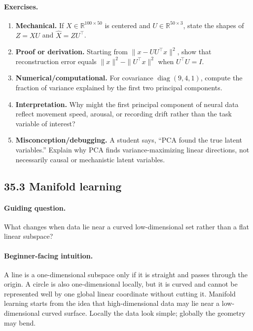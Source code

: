 \paragraph{Exercises.}
\begin{enumerate}[label=\textbf{35.2.\arabic*.}, leftmargin=*]
\item \textbf{Mechanical.} If \(X\in\mathbb R^{100\times 50}\) is centered and \(U\in\mathbb R^{50\times 3}\), state the shapes of \(Z=XU\) and \(\widehat X=Z U^\top\).
\item \textbf{Proof or derivation.} Starting from \(\|x-UU^\top x\|^2\), show that reconstruction error equals \(\|x\|^2-\|U^\top x\|^2\) when \(U^\top U=I\).
\item \textbf{Numerical/computational.} For covariance \(\operatorname{diag}(9,4,1)\), compute the fraction of variance explained by the first two principal components.
\item \textbf{Interpretation.} Why might the first principal component of neural data reflect movement speed, arousal, or recording drift rather than the task variable of interest?
\item \textbf{Misconception/debugging.} A student says, ``PCA found the true latent variables.'' Explain why PCA finds variance-maximizing linear directions, not necessarily causal or mechanistic latent variables.
\end{enumerate}

\subsection{35.3 Manifold learning}

\paragraph{Guiding question.}
What changes when data lie near a curved low-dimensional set rather than a flat linear subspace?

\paragraph{Beginner-facing intuition.}
A line is a one-dimensional subspace only if it is straight and passes through the origin. A circle is also one-dimensional locally, but it is curved and cannot be represented well by one global linear coordinate without cutting it. Manifold learning starts from the idea that high-dimensional data may lie near a low-dimensional curved surface. Locally the data look simple; globally the geometry may bend.

